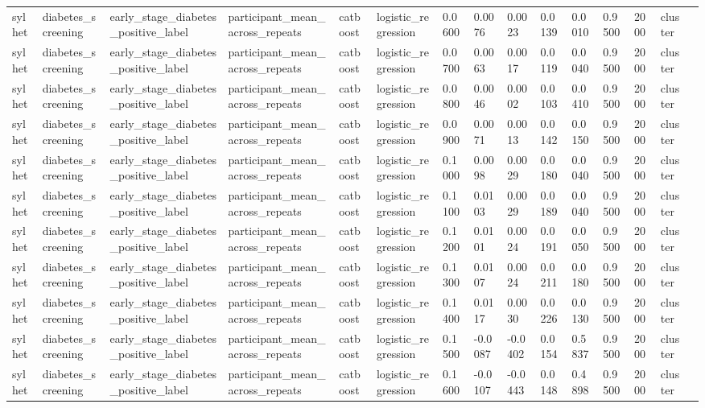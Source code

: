 \begin{tabular}{lllllllllllllll}
sylhet & diabetes\_screening & early\_stage\_diabetes\_positive\_label & participant\_mean\_across\_repeats & catboost & logistic\_regression & 0.0600 & 0.0076 & 0.0023 & 0.0139 & 0.0010 & 0.9500 & 2000 & cluster &  \\
sylhet & diabetes\_screening & early\_stage\_diabetes\_positive\_label & participant\_mean\_across\_repeats & catboost & logistic\_regression & 0.0700 & 0.0063 & 0.0017 & 0.0119 & 0.0040 & 0.9500 & 2000 & cluster &  \\
sylhet & diabetes\_screening & early\_stage\_diabetes\_positive\_label & participant\_mean\_across\_repeats & catboost & logistic\_regression & 0.0800 & 0.0046 & 0.0002 & 0.0103 & 0.0410 & 0.9500 & 2000 & cluster &  \\
sylhet & diabetes\_screening & early\_stage\_diabetes\_positive\_label & participant\_mean\_across\_repeats & catboost & logistic\_regression & 0.0900 & 0.0071 & 0.0013 & 0.0142 & 0.0150 & 0.9500 & 2000 & cluster &  \\
sylhet & diabetes\_screening & early\_stage\_diabetes\_positive\_label & participant\_mean\_across\_repeats & catboost & logistic\_regression & 0.1000 & 0.0098 & 0.0029 & 0.0180 & 0.0040 & 0.9500 & 2000 & cluster &  \\
sylhet & diabetes\_screening & early\_stage\_diabetes\_positive\_label & participant\_mean\_across\_repeats & catboost & logistic\_regression & 0.1100 & 0.0103 & 0.0029 & 0.0189 & 0.0040 & 0.9500 & 2000 & cluster &  \\
sylhet & diabetes\_screening & early\_stage\_diabetes\_positive\_label & participant\_mean\_across\_repeats & catboost & logistic\_regression & 0.1200 & 0.0101 & 0.0024 & 0.0191 & 0.0050 & 0.9500 & 2000 & cluster &  \\
sylhet & diabetes\_screening & early\_stage\_diabetes\_positive\_label & participant\_mean\_across\_repeats & catboost & logistic\_regression & 0.1300 & 0.0107 & 0.0024 & 0.0211 & 0.0180 & 0.9500 & 2000 & cluster &  \\
sylhet & diabetes\_screening & early\_stage\_diabetes\_positive\_label & participant\_mean\_across\_repeats & catboost & logistic\_regression & 0.1400 & 0.0117 & 0.0030 & 0.0226 & 0.0130 & 0.9500 & 2000 & cluster &  \\
sylhet & diabetes\_screening & early\_stage\_diabetes\_positive\_label & participant\_mean\_across\_repeats & catboost & logistic\_regression & 0.1500 & -0.0087 & -0.0402 & 0.0154 & 0.5837 & 0.9500 & 2000 & cluster &  \\
sylhet & diabetes\_screening & early\_stage\_diabetes\_positive\_label & participant\_mean\_across\_repeats & catboost & logistic\_regression & 0.1600 & -0.0107 & -0.0443 & 0.0148 & 0.4898 & 0.9500 & 2000 & cluster &  \\

\end{tabular}
